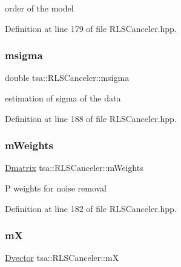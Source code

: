 order of the model 

Definition at line 179 of file R\+L\+S\+Canceler.\+hpp.

\mbox{\label{classtsa_1_1_r_l_s_canceler_a290c458da793dc228fb0a2c2fc0cfd8a}} 
\subsubsection{\texorpdfstring{msigma}{msigma}}
{\footnotesize\ttfamily double tsa\+::\+R\+L\+S\+Canceler\+::msigma\hspace{0.3cm}{\ttfamily [private]}}

estimation of sigma of the data 

Definition at line 188 of file R\+L\+S\+Canceler.\+hpp.

\mbox{\label{classtsa_1_1_r_l_s_canceler_a9abd498386c6750bfa22910242ace12e}} 
\subsubsection{\texorpdfstring{m\+Weights}{mWeights}}
{\footnotesize\ttfamily \hyperlink{namespacetsa_ad260cd21c1891c4ed391fe788569aba4}{Dmatrix} tsa\+::\+R\+L\+S\+Canceler\+::m\+Weights\hspace{0.3cm}{\ttfamily [private]}}

P weights for noise removal 

Definition at line 182 of file R\+L\+S\+Canceler.\+hpp.

\mbox{\label{classtsa_1_1_r_l_s_canceler_ac555ed3641b607e0818eb0d55d09e024}} 
\subsubsection{\texorpdfstring{mX}{mX}}
{\footnotesize\ttfamily \hyperlink{namespacetsa_a8900fb03d849baf447a1a0efe2561fb2}{Dvector} tsa\+::\+R\+L\+S\+Canceler\+::mX\hspace{0.3cm}{\ttfamily [private]}}

